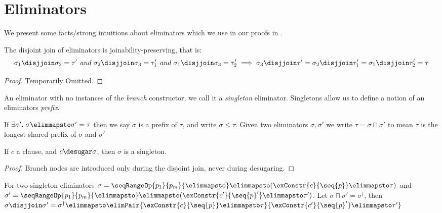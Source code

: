 \section{Eliminators}
We present some facts/strong intuitions about eliminators which we use in our proofs in .



\begin{theorem}
   \label{thm:join-preserves-join}
   The disjoint join of eliminators is joinability-preserving, that is:
   $$
      \sigma_1 \disjjoin \sigma_2 = \tau'\textit{ and }\sigma_2 \disjjoin \sigma_3 = \tau'_1\textit{ and }\sigma_1 \disjjoin \sigma_3 = \tau'_2
      \newline
      \implies \sigma_3 \disjjoin \tau' = \sigma_2 \disjjoin \tau'_1 = \sigma_1 \disjjoin \tau'_2 = \tau
   $$
\end{theorem}
\begin{proof}
   Temporarily Omitted.
\end{proof}

An eliminator with no instances of the \textit{branch} constructor, we call it a \textit{singleton} eliminator.
Singletons allow us to define a notion of an eliminators \textit{prefix}.

\begin{definition}
   If $\exists \sigma'.\; \sigma \elimmapsto \sigma' = \tau$ then we say $\sigma$ is a prefix of $\tau$,
   and write $\sigma \leq \tau$. Given two eliminators $\sigma,\sigma'$ we write $\tau = \sigma \sqcap \sigma'$
   to mean $\tau$ is the longest shared prefix of $\sigma$ and $\sigma'$
\end{definition}
\begin{lemma}
   If $c$ a clause, and $c \desugar \sigma$, then $\sigma$ is a singleton.
\end{lemma}
\begin{proof}
   Branch nodes are introduced only during the disjoint join, never during desugaring.
\end{proof}
\begin{lemma}
   For two singleton eliminators $\sigma = \seqRangeOp{p_1}{p_m}{\elimmapsto} \elimmapsto (\exConstr{c}{\seq{p}} \elimmapsto \tau)$ and
   $\sigma' = \seqRangeOp{p_1}{p_m}{\elimmapsto} \elimmapsto (\exConstr{c'}{\seq{p}'} \elimmapsto \tau')$.
   Let $\sigma \sqcap \sigma' = \sigma^{\dag}$, then
   $\sigma \disjjoin \sigma' = \sigma^{\dag} \elimmapsto \elimPair{\exConstr{c}{\seq{p}} \elimmapsto \tau}{\exConstr{c'}{\seq{p}'} \elimmapsto \tau'}$
\end{lemma}